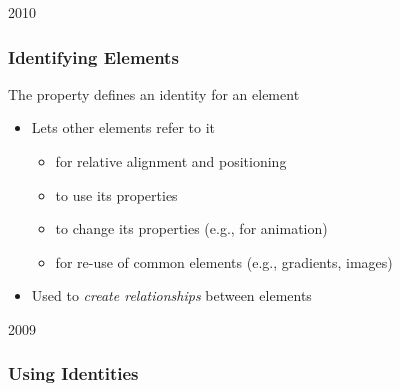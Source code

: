 
\begin{slide}{2010}\frametitle{Identifying Elements}


The  property defines an identity for an element

\begin{itemize}
\item Lets other elements refer to it
  \begin{itemize}
  \item for relative alignment and positioning
  \item to use its properties
  \item to change its properties (e.g., for animation)
  \item for re-use of common elements (e.g., gradients, images)
  \end{itemize}
\item Used to \textit{create relationships} between elements
\end{itemize}


\end{slide}


\begin{slide}{2009}\frametitle{Using Identities}



\end{slide}



